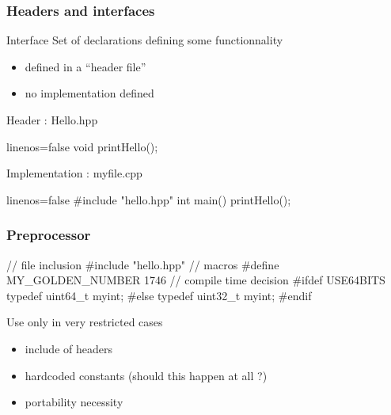 \begin{frame}[fragile]
  \frametitle{Headers and interfaces}
  \begin{block}{Interface}
    Set of declarations defining some functionnality
    \begin{itemize}
    \item defined in a ``header file''
    \item no implementation defined
    \end{itemize}
  \end{block}
  \begin{block}{Header : Hello.hpp}
    \begin{cppcode*}{linenos=false}
      void printHello();
    \end{cppcode*}
  \end{block}
  \begin{block}{Implementation : myfile.cpp}
    \begin{cppcode*}{linenos=false}
      #include "hello.hpp"
      int main() {
        printHello();
      }
    \end{cppcode*}  
  \end{block}
\end{frame}

\begin{frame}[fragile]
  \frametitle{Preprocessor}
  \begin{cppcode}
    // file inclusion
    #include "hello.hpp"
    // macros
    #define MY_GOLDEN_NUMBER 1746
    // compile time decision
    #ifdef USE64BITS
      typedef uint64_t myint;
    #else
      typedef uint32_t myint;
    #endif
  \end{cppcode}
  \pause
  \begin{block}{Use only in very restricted cases}
    \begin{itemize}
    \item include of headers
    \item hardcoded constants {\scriptsize (should this happen at all ?)}
    \item portability necessity
    \end{itemize}
  \end{block}
\end{frame}
